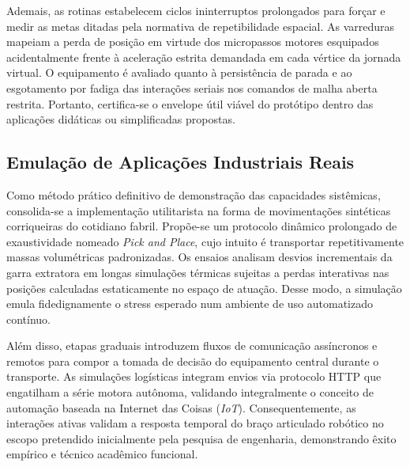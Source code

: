 Ademais, as rotinas estabelecem ciclos ininterruptos prolongados para forçar e medir as metas ditadas pela normativa de repetibilidade espacial. As varreduras mapeiam a perda de posição em virtude dos micropassos motores esquipados acidentalmente frente à aceleração estrita demandada em cada vértice da jornada virtual. O equipamento é avaliado quanto à persistência de parada e ao esgotamento por fadiga das interações seriais nos comandos de malha aberta restrita. Portanto, certifica-se o envelope útil viável do protótipo dentro das aplicações didáticas ou simplificadas propostas.

\subsection{Emulação de Aplicações Industriais Reais}

Como método prático definitivo de demonstração das capacidades sistêmicas, consolida-se a implementação utilitarista na forma de movimentações sintéticas corriqueiras do cotidiano fabril. Propõe-se um protocolo dinâmico prolongado de exaustividade nomeado \textit{Pick and Place}, cujo intuito é transportar repetitivamente massas volumétricas padronizadas. Os ensaios analisam desvios incrementais da garra extratora em longas simulações térmicas sujeitas a perdas interativas nas posições calculadas estaticamente no espaço de atuação. Desse modo, a simulação emula fidedignamente o stress esperado num ambiente de uso automatizado contínuo.

Além disso, etapas graduais introduzem fluxos de comunicação assíncronos e remotos para compor a tomada de decisão do equipamento central durante o transporte. As simulações logísticas integram envios via protocolo HTTP que engatilham a série motora autônoma, validando integralmente o conceito de automação baseada na Internet das Coisas (\textit{IoT}). Consequentemente, as interações ativas validam a resposta temporal do braço articulado robótico no escopo pretendido inicialmente pela pesquisa de engenharia, demonstrando êxito empírico e técnico acadêmico funcional.

